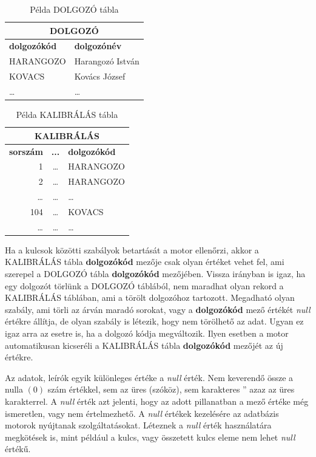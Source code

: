 \documentclass[a4paper,12pt]{report}
\begin{document}
\begin{table}[ht!]
	\centering
\begin{tabular}{|l|l|}
        \hline
        \multicolumn{2}{|c|}{\textbf{DOLGOZÓ}}\\
        \hline
        \textbf{dolgozókód}&\textbf{dolgozónév}\\
        \hline
        HARANGOZO&Harangozó István\\
        \hline
        KOVACS&Kovács József\\
        \hline
        \dots&\dots\\
        \end{tabular}
        \caption{Példa DOLGOZÓ tábla}\label{dolg}
\end{table}

\begin{table}[ht!]
\centering
\begin{tabular}{|r|c|l|}
        \hline
        \multicolumn{3}{|c|}{\textbf{KALIBRÁLÁS}}\\
        \hline
        \textbf{sorszám}&\textbf{...}&\textbf{dolgozókód}\\
        \hline
        1&\dots&HARANGOZO\\
        \hline
        2&\dots&HARANGOZO\\
        \hline
        \dots&\dots&\dots\\
        \hline
        104&\dots&KOVACS\\
        \hline
        \dots&\dots&\dots\\
\end{tabular}
\caption{Példa KALIBRÁLÁS tábla}\label{kalib}
\end{table}
        

Ha a kulcsok közötti szabályok betartását a motor ellenőrzi, akkor a KALIBRÁLÁS 
tábla \textbf{dolgozókód} mezője csak olyan értéket vehet fel, ami szerepel a 
DOLGOZÓ tábla \textbf{dolgozókód} mezőjében. Vissza irányban is igaz, ha egy 
dolgozót törlünk a DOLGOZÓ táblából, nem maradhat olyan rekord a KALIBRÁLÁS 
táblában, ami a törölt dolgozóhoz tartozott. Megadható olyan szabály, ami törli 
az árván maradó sorokat, vagy a \textbf{dolgozókód} mező értékét \textit{null} 
értékre állítja, de olyan szabály is létezik, hogy nem törölhető az adat.
Ugyan ez igaz arra az esetre is, ha a dolgozó kódja megváltozik. Ilyen esetben 
a motor automatikusan kicseréli a KALIBRÁLÁS tábla \textbf{dolgozókód} mezőjét 
az új értékre.

Az adatok, leírók egyik különleges értéke a \textit{null} érték. Nem keverendő
össze a nulla $(0)$ szám értékkel, sem az üres (szóköz), sem karakteres
'' azaz az üres karakterrel. A \textit{null} érték azt jelenti, 
hogy az adott pillanatban a mező értéke még ismeretlen, vagy nem értelmezhető.
A \textit{null} értékek kezelésére az adatbázis motorok nyújtanak 
szolgáltatásokat. Léteznek a \textit{null} érték használatára megkötések is, mint például a kulcs, vagy összetett kulcs eleme nem lehet \textit{null} értékű.
\end{document}
